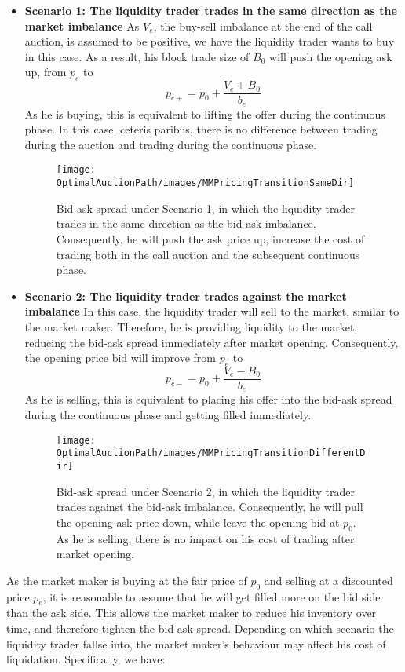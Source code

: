 \begin{itemize}
  \item {\textbf{Scenario 1: The liquidity trader trades in the same direction as the market imbalance}
        As $V_e$, the buy-sell imbalance at the end of the call auction, is assumed to be positive, we have the liquidity trader wants to buy in this case. As a result, his block trade size of $B_0$ will push the opening ask up, from $p_e$ to
        \[
          p_{e+} =  p_0 + \frac{V_e + B_0}{b_e}
        \]
        As he is buying, this is equivalent to lifting the offer during the continuous phase. In this case, ceteris paribus, there is no difference between trading during the auction and trading during the continuous phase.

        \begin{figure}[h]
          \texttt{[image: \\OptimalAuctionPath/images/MMPricingTransitionSameDir]}
          \caption{Bid-ask spread under Scenario 1, in which the liquidity trader trades in the same direction as the bid-ask imbalance. Consequently, he will push the ask price up, increase the cost of trading both in the call auction and the subsequent continuous phase.}
          \label{fig:mm_pricing_transition_s1}
        \end{figure}
        }
  \item {
        \textbf{Scenario 2: The liquidity trader trades against the market imbalance}
        In this case, the liquidity trader will sell to the market, similar to the market maker. Therefore, he is providing liquidity to the market, reducing the bid-ask spread immediately after market opening. Consequently, the opening price bid will improve from $p_e$ to
        \[
          p_{e-} = p_0 + \frac{V_e - B_0}{b_e}
        \]
        As he is selling, this is equivalent to placing his offer into the bid-ask spread during the continuous phase and getting filled immediately.
        \begin{figure}[h]
          \texttt{[image: \\OptimalAuctionPath/images/MMPricingTransitionDifferentDir]}
          \caption{Bid-ask spread under Scenario 2, in which the liquidity trader trades against the bid-ask imbalance. Consequently, he will pull the opening ask price down, while leave the opening bid at $p_0$. As he is selling, there is no impact on his cost of trading after market opening.}
          \label{fig:mm_pricing_transition_s2}
        \end{figure}
        }
\end{itemize}
As the market maker is buying at the fair price of $p_0$ and selling at a discounted price $p_e$, it is reasonable to assume that he will get filled more on the bid side than the ask side. This allows the market maker to reduce his inventory over time, and therefore tighten the bid-ask spread. Depending on which scenario the liquidity trader fallse into, the market maker's behaviour may affect his cost of liquidation. Specifically, we have:

